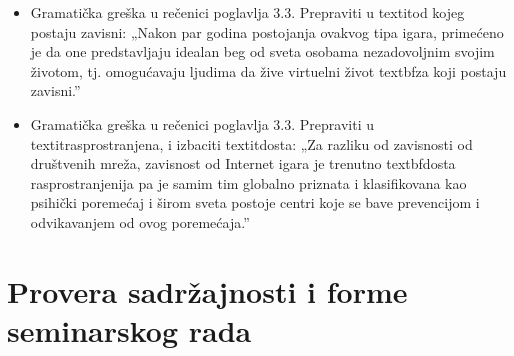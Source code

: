 \documentclass[a4paper]{report}
\newcommand{\odgovor}[1]{\textcolor{blue}{#1}}
\begin{document}
\begin{itemize}
    \item Gramatička greška u rečenici poglavlja 3.3. Prepraviti u textit{od kojeg postaju zavisni}:
    \newline
    „Nakon par godina postojanja ovakvog tipa igara, primećeno je da one predstavljaju idealan beg od sveta osobama nezadovoljnim svojim životom, tj. omogućavaju ljudima da žive virtuelni život textbf{za koji postaju zavisni}.”
    
    \odgovor{}
    
\end{itemize}
\begin{itemize}
    \item Gramatička greška u rečenici poglavlja 3.3. Prepraviti u textit{rasprostranjena}, i izbaciti textit{dosta}:
    \newline
    „Za razliku od zavisnosti od društvenih mreža, zavisnost od Internet igara je trenutno textbf{dosta rasprostranjenija} pa je samim tim globalno priznata i klasifikovana kao psihički poremećaj i širom sveta postoje centri koje se bave prevencijom i odvikavanjem od ovog poremećaja.”
    
    \odgovor{}
    
    
\end{itemize}
\section{Provera sadržajnosti i forme seminarskog rada}
\end{document}
